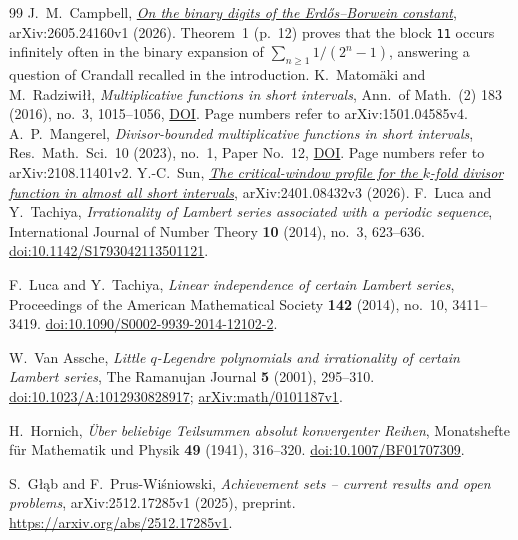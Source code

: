 \begin{thebibliography}{99}
 J.~M.~Campbell,
  \href{https://arxiv.org/abs/2605.24160v1}{\emph{On the binary digits of the
  Erd\H{o}s--Borwein constant}}, arXiv:2605.24160v1 (2026).  Theorem~1 (p.~12)
  proves that the block \texttt{11} occurs infinitely often in the binary
  expansion of $\sum_{n\ge1}1/(2^n-1)$, answering a question of Crandall
  recalled in the introduction.
 K.~Matom\"aki and M.~Radziwi\l\l,
  \emph{Multiplicative functions in short intervals}, Ann.\ of Math.\ (2) 183
  (2016), no.~3, 1015--1056,
  \href{https://doi.org/10.4007/annals.2016.183.3.6}{DOI}.  Page numbers
  refer to arXiv:1501.04585v4.
 A.~P.~Mangerel, \emph{Divisor-bounded multiplicative
  functions in short intervals}, Res.\ Math.\ Sci.\ 10 (2023), no.~1, Paper
  No.~12, \href{https://doi.org/10.1007/s40687-023-00376-0}{DOI}.  Page numbers
  refer to arXiv:2108.11401v2.
 Y.-C.~Sun,
  \href{https://arxiv.org/abs/2401.08432v3}{\emph{The critical-window profile
  for the $k$-fold divisor function in almost all short intervals}},
  arXiv:2401.08432v3 (2026).
F.~Luca and Y.~Tachiya,
\emph{Irrationality of Lambert series associated with a periodic sequence},
International Journal of Number Theory \textbf{10} (2014), no.~3, 623--636.
\href{https://doi.org/10.1142/S1793042113501121}{doi:10.1142/S1793042113501121}.

F.~Luca and Y.~Tachiya,
\emph{Linear independence of certain Lambert series},
Proceedings of the American Mathematical Society \textbf{142} (2014), no.~10, 3411--3419.
\href{https://doi.org/10.1090/S0002-9939-2014-12102-2}{doi:10.1090/S0002-9939-2014-12102-2}.

W.~Van Assche,
\emph{Little $q$-Legendre polynomials and irrationality of certain Lambert series},
The Ramanujan Journal \textbf{5} (2001), 295--310.
\href{https://doi.org/10.1023/A:1012930828917}{doi:10.1023/A:1012930828917};
\href{https://arxiv.org/abs/math/0101187v1}{arXiv:math/0101187v1}.

H.~Hornich,
\emph{\"Uber beliebige Teilsummen absolut konvergenter Reihen},
Monatshefte f\"ur Mathematik und Physik \textbf{49} (1941), 316--320.
\href{https://doi.org/10.1007/BF01707309}{doi:10.1007/BF01707309}.

S.~G\l\k{a}b and F.~Prus-Wi\'sniowski,
\emph{Achievement sets -- current results and open problems},
arXiv:2512.17285v1 (2025), preprint.
\url{https://arxiv.org/abs/2512.17285v1}.


\end{thebibliography}
